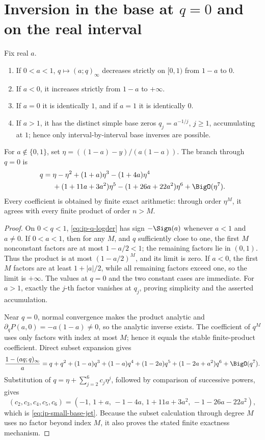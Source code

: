 \section{Inversion in the base at \(q=0\) and on the real interval}
\label{sec:ip-real-base}

\begin{theorem}
\label{thm:ip-real-base}
Fix real \(a\).
\begin{enumerate}
\item If \(0<a<1\), \(q\mapsto(a;q)_\infty\) decreases strictly on
  \([0,1)\) from \(1-a\) to \(0\).
\item If \(a<0\), it increases strictly from \(1-a\) to \(+\infty\).
\item If \(a=0\) it is identically \(1\), and if \(a=1\) it is identically
  \(0\).
\item If \(a>1\), it has the distinct simple base zeros
  \(q_j=a^{-1/j}\), \(j\geq1\), accumulating at \(1\); hence only
  interval-by-interval base inverses are possible.
\end{enumerate}
For \(a\notin\{0,1\}\), set
\(\eta=((1-a)-y)/(a(1-a))\).  The branch through \(q=0\) is
\begin{align}
 q={}&\eta-\eta^2+(1+a)\eta^3-(1+4a)\eta^4 \notag\\
 &+(1+11a+3a^2)\eta^5-(1+26a+22a^2)\eta^6
 +\BigO(\eta^7).
 \label{eq:ip-small-base-jet}
\end{align}
Every coefficient is obtained by finite exact arithmetic: through order
\(\eta^M\), it agrees with every finite product of order \(n>M\).
\end{theorem}

\begin{proof}
On \(0<q<1\), \cref{eq:ip-q-logder} has sign \(-\Sign(a)\) whenever \(a<1\)
and \(a\ne0\).  If \(0<a<1\), then for any \(M\), and \(q\) sufficiently
close to one, the first \(M\) nonconstant factors are at most
\(1-a/2<1\); the remaining factors lie in \((0,1)\).  Thus the product is at
most \((1-a/2)^M\), and its limit is zero.  If \(a<0\), the first \(M\)
factors are at least \(1+|a|/2\), while all remaining factors exceed one, so
the limit is \(+\infty\).  The values at \(q=0\) and the two constant cases
are immediate.  For \(a>1\), exactly the \(j\)-th factor vanishes at
\(q_j\), proving simplicity and the asserted accumulation.

Near \(q=0\), normal convergence makes the product analytic and
\(\partial_qP(a,0)=-a(1-a)\ne0\), so the analytic inverse exists.  The
coefficient of \(q^M\) uses only factors with index at most \(M\); hence it
equals the stable finite-product coefficient.  Direct subset expansion gives
\[
 \frac{1-(aq;q)_\infty}{a}
 =q+q^2+(1-a)q^3+(1-a)q^4+(1-2a)q^5
 +(1-2a+a^2)q^6+\BigO(q^7).
\]
Substitution of \(q=\eta+\sum_{j=2}^{6}c_j\eta^j\), followed by comparison of
successive powers, gives
\[
 (c_2,c_3,c_4,c_5,c_6)
 =(-1,\,1+a,\,-1-4a,\,1+11a+3a^2,\,-1-26a-22a^2),
\]
which is \cref{eq:ip-small-base-jet}.  Because the subset calculation through
degree \(M\) uses no factor beyond index \(M\), it also proves the stated
finite exactness mechanism.
\end{proof}

